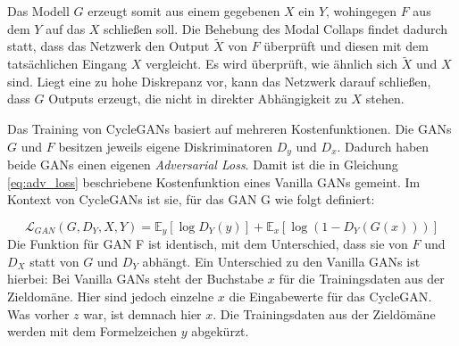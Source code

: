 Das Modell $G$ erzeugt somit aus einem gegebenen $X$ ein $Y$, wohingegen $F$ aus dem $Y$ auf das $X$ schließen soll. Die Behebung des Modal Collaps findet dadurch statt, dass das Netzwerk den Output $\tilde{X}$ von $F$ überprüft und diesen mit dem tatsächlichen Eingang $X$ vergleicht. Es wird überprüft, wie ähnlich sich $\tilde{X}$ und $X$ sind. Liegt eine zu hohe Diskrepanz vor, kann das Netzwerk darauf schließen, dass $G$ Outputs erzeugt, die nicht in direkter Abhängigkeit zu $X$ stehen. \cite{cycleGAN}

Das Training von \acp{CycleGAN} basiert auf mehreren Kostenfunktionen. Die \acp{GAN} $G$ und $F$ besitzen jeweils eigene Diskriminatoren $D_y$ und $D_x$. Dadurch haben beide \acp{GAN} einen eigenen \emph{Adversarial Loss}. Damit ist die in Gleichung \ref{eq:adv_loss} beschriebene Kostenfunktion eines Vanilla \acp{GAN} gemeint. Im Kontext von \acp{CycleGAN} ist sie, für das \ac{GAN} G wie folgt definiert: \cite{cycleGAN}

\begin{equation}
	\mathcal{L}_{GAN}(G, D_Y, X, Y) = \mathbb{E}_y[\log{D_Y(y)}] + \mathbb{E}_x[\log(1-D_Y(G(x)))]
\end{equation}
Die Funktion für \ac{GAN} F ist identisch, mit dem Unterschied, dass sie von $F$ und $D_X$ statt von $G$ und $D_Y$ abhängt. Ein Unterschied zu den Vanilla \acp{GAN} ist hierbei: Bei Vanilla \acp{GAN} steht der Buchstabe $x$ für die Trainingsdaten aus der Zieldomäne. Hier sind jedoch einzelne $x$ die Eingabewerte für das \ac{CycleGAN}. Was vorher $z$ war, ist demnach hier $x$. Die Trainingsdaten aus der Zieldömäne werden mit dem Formelzeichen $y$ abgekürzt. \cite{cycleGAN}


